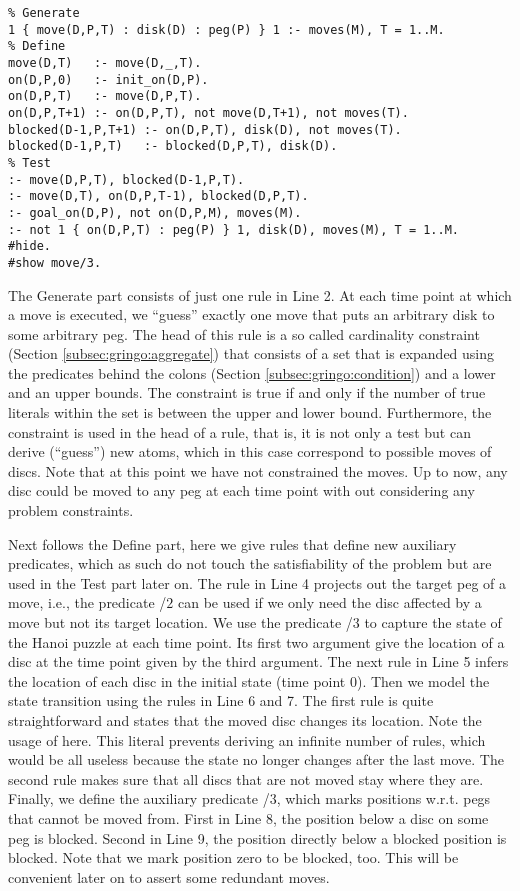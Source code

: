 \begin{lstlisting}
% Generate
1 { move(D,P,T) : disk(D) : peg(P) } 1 :- moves(M), T = 1..M.
% Define
move(D,T)   :- move(D,_,T).
on(D,P,0)   :- init_on(D,P).
on(D,P,T)   :- move(D,P,T).
on(D,P,T+1) :- on(D,P,T), not move(D,T+1), not moves(T).
blocked(D-1,P,T+1) :- on(D,P,T), disk(D), not moves(T).
blocked(D-1,P,T)   :- blocked(D,P,T), disk(D).
% Test
:- move(D,P,T), blocked(D-1,P,T).
:- move(D,T), on(D,P,T-1), blocked(D,P,T).
:- goal_on(D,P), not on(D,P,M), moves(M). 
:- not 1 { on(D,P,T) : peg(P) } 1, disk(D), moves(M), T = 1..M.
#hide.
#show move/3. 
\end{lstlisting}%
The Generate part consists of just one rule in Line 2.
At each time point  at which a move is executed, we
``guess'' exactly one move that puts an arbitrary disk to some arbitrary peg.
The head of this rule is a so called cardinality constraint (Section \ref{subsec:gringo:aggregate}) that
consists of a set that is expanded using the predicates behind the colons (Section \ref{subsec:gringo:condition}) and a lower and an upper bounds.
The constraint is true if and only if the number of true literals within the set is between the upper and lower bound.
Furthermore, the constraint is used in the head of a rule, 
that is, it is not only a test but can derive (``guess'') new atoms, which in this case correspond to possible moves of discs.
Note that at this point we have not constrained the moves.
Up to now, any disc could be moved to any peg at each time point with out considering any problem constraints.

Next follows the Define part, here we give rules that define new auxiliary predicates, 
which as such do not touch the satisfiability of the problem but are used in the Test part later on.
The rule in Line 4 projects out the target peg of a move, i.e., the predicate /$2$ can be used 
if we only need the disc affected by a move but not its target location.
We use the predicate /$3$ to capture the state of the Hanoi puzzle at each time point.
Its first two argument give the location of a disc at the time point given by the third argument.
The next rule in Line 5 infers the location of each disc in the initial state (time point 0).
Then we model the state transition using the rules in Line 6 and 7.
The first rule is quite straightforward and states that the moved disc changes its location.
Note the usage of  here.
This literal prevents deriving an infinite number of rules, which would be all useless 
because the state no longer changes after the last move.
The second rule makes sure that all discs that are not moved stay where they are.
Finally, we define the auxiliary predicate /$3$, 
which marks positions w.r.t. pegs that cannot be moved from.
First in Line 8, the position below a disc on some peg is blocked.
Second in Line 9, the position directly below a blocked position is blocked.
Note that we mark position zero to be blocked, too.
This will be convenient later on to assert some redundant moves.

